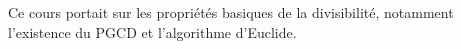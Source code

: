 Ce cours portait sur les propriétés basiques de la divisibilité, notamment l'existence du PGCD et l'algorithme d'Euclide.